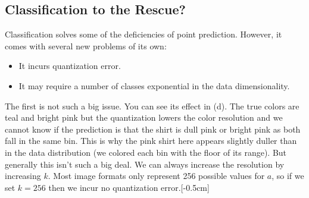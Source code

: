 \subsection{Classification to the Rescue?}

Classification solves some of the deficiencies of point prediction. However, it comes with several new problems of its own:
\begin{itemize}
    \item It incurs quantization error.
    \item It may require a number of classes exponential in the data dimensionality.
\end{itemize}
The first is not such a big issue. You can see its effect in \fig{\ref{fig:conditional_generative_models:tshirts}}(d). The true colors are teal and bright pink but the quantization lowers the color resolution and we cannot know if the prediction is that the shirt is dull pink or bright pink as both fall in the same bin. This is why the pink shirt here appears slightly duller than in the data distribution (we colored each bin with the floor of its range). But generally this isn't such a big deal. We can always increase the resolution by increasing $k$. Most image formats only represent 256 possible values for $a$, so if we set $k=256$ then we incur no quantization error.[-0.5cm]

